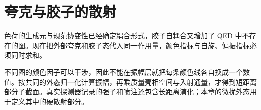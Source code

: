\chapter{夸克与胶子的散射}\label{chap:quark-gluon-scattering}

色荷的生成元与规范协变性已经确定耦合形式，胶子自耦合又增加了 QED 中不存在的图。现在把外部夸克和胶子态代入同一作用量，颜色指标与自旋、偏振指标必须同时求和。

不同图的颜色因子可以干涉，因此不能在振幅层就把每条颜色线各自换成一个数值。按共同的外态归一化计算振幅，再乘质量壳相空间与入射通量，才得到短距离部分子截面。真实探测器记录的强子和喷注还包含长距离演化；本章的微扰外态用于定义其中的硬散射部分。





